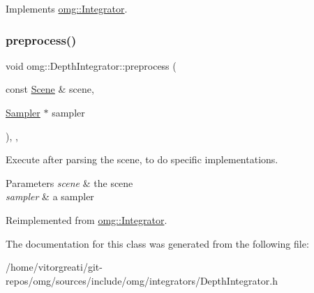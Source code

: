 Implements \mbox{\hyperlink{classomg_1_1_integrator_a2922583794310f6b1ff8ee121666f7a1}{omg\+::\+Integrator}}.

\mbox{\label{classomg_1_1_depth_integrator_a4ef7ff8e7499862d1416eda91b5ec2f1}} 
\subsubsection{\texorpdfstring{preprocess()}{preprocess()}}
{\footnotesize\ttfamily void omg\+::\+Depth\+Integrator\+::preprocess (\begin{DoxyParamCaption}\item[{const \mbox{\hyperlink{classomg_1_1_scene}{Scene}} \&}]{scene,  }\item[{\mbox{\hyperlink{classomg_1_1_sampler}{Sampler}} $\ast$}]{sampler }\end{DoxyParamCaption})\hspace{0.3cm}{\ttfamily [inline]}, {\ttfamily [override]}, {\ttfamily [virtual]}}



Execute after parsing the scene, to do specific implementations. 


\begin{DoxyParams}{Parameters}
{\em scene} & the scene \\
\hline
{\em sampler} & a sampler \\
\hline
\end{DoxyParams}


Reimplemented from \mbox{\hyperlink{classomg_1_1_integrator_ac465a582d2dc3a795247f37f7edcdc47}{omg\+::\+Integrator}}.



The documentation for this class was generated from the following file\+:\begin{DoxyCompactItemize}
\item 
/home/vitorgreati/git-\/repos/omg/sources/include/omg/integrators/Depth\+Integrator.\+h\end{DoxyCompactItemize}
